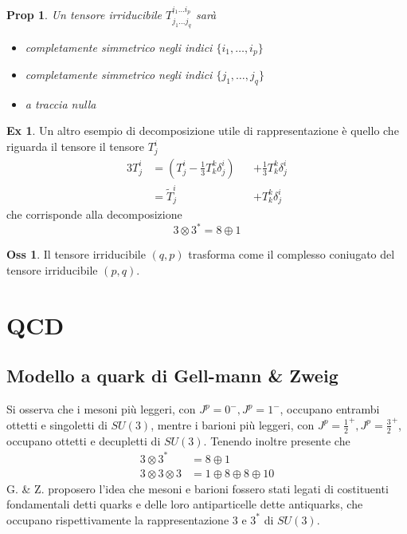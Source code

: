 \documentclass[10pt,a4paper]{article}
\newtheorem{prop}{Prop}[section]
\theoremstyle{definition}
\newtheorem{observation}{Oss}[section]
\newtheorem{example}{Ex}[section]
\begin{document}
\begin{prop}
    Un tensore irriducibile $T_{j_1 \dots j_q}^{i_1 \dots i_p}$ sarà
    \begin{itemize}
        \item completamente simmetrico negli indici $\{i_1, \dots, i_p\}$
        \item completamente simmetrico negli indici $\{j_1, \dots, j_q\}$
        \item a traccia nulla
    \end{itemize}
\end{prop}

\begin{example}
    Un altro esempio di decomposizione utile di rappresentazione è quello che riguarda il tensore il tensore $T_j^i$
    \begin{alignat*}{3}
        T^i_j &= (T^i_j - \frac13 T_k^k \delta^i_j) &&+ \frac13 T_k^k \delta^i_j \\
        &= \tilde{T}^i_j &&+ T_k^k \delta^i_j 
    \end{alignat*}
    che corrisponde alla decomposizione 
    \[
    3 \otimes 3^* = 8 \oplus 1    
    \]
\end{example}

\begin{observation}
    Il tensore irriducibile $(q, p)$ trasforma come il complesso coniugato del tensore irriducibile $(p, q)$.
\end{observation}

\section{QCD}
\subsection{Modello a quark di Gell-mann \& Zweig}
Si osserva che i mesoni più leggeri, con \(J^p = 0^-, J^p = 1^-\), occupano entrambi ottetti e singoletti di \(SU(3)\), mentre i barioni più leggeri, con \(J^p = \frac12^+, J^p=\frac32^+\), occupano ottetti e decupletti di \(SU(3)\).
Tenendo inoltre presente che 
\begin{align*}
    3 \otimes 3^* &= 8 \oplus 1 \\
    3 \otimes 3 \otimes 3 &= 1 \oplus 8 \oplus 8 \oplus 10
\end{align*}
G. \& Z. proposero l'idea che mesoni e barioni fossero stati legati di costituenti fondamentali detti quarks e delle loro antiparticelle dette antiquarks, che occupano rispettivamente la rappresentazione \(3\) e \(3^*\) di \(SU(3)\).
\end{document}

